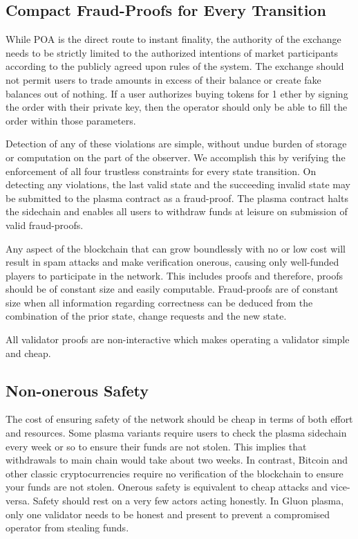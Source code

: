\documentclass[12pt,a4paper]{article}
\begin{document}
\subsection{Compact Fraud-Proofs for Every Transition}
While POA is the direct route to instant finality, the authority of the exchange needs to be strictly limited to the authorized intentions of market participants according to the publicly agreed upon rules of the system. The exchange should not permit users to trade amounts in excess of their balance or create fake balances out of nothing. If a user authorizes buying  tokens for 1 ether by signing the order with their private key, then the operator should only be able to fill the order within those parameters. 

Detection of any of these violations are simple, without undue burden of storage or computation on the part of the observer. We accomplish this by verifying the enforcement of all four trustless constraints for every state transition. On detecting any violations, the last valid state and the succeeding invalid state may be submitted to the plasma contract as a fraud-proof. The plasma contract halts the sidechain and enables all users to withdraw funds at leisure on submission of valid fraud-proofs.

Any aspect of the blockchain that can grow boundlessly with no or low cost will result in spam attacks and make verification onerous, causing only well-funded players to participate in the network. This includes proofs and therefore, proofs should be of constant size and easily computable. Fraud-proofs are of constant size when all information regarding correctness can be deduced from the combination of the prior state, change requests and the new state.

All validator proofs are non-interactive which makes operating a validator simple and cheap. 

\subsection{Non-onerous Safety}
The cost of ensuring safety of the network should be cheap in terms of both effort and resources. Some plasma variants require users to check the plasma sidechain every week or so to ensure their funds are not stolen. This implies that withdrawals to main chain would take about two weeks. In contrast, Bitcoin and other classic cryptocurrencies require no verification of the blockchain to ensure your funds are not stolen. Onerous safety is equivalent to cheap attacks and vice-versa. Safety should rest on a very few actors acting honestly. In Gluon plasma, only one validator needs to be honest and present to prevent a compromised operator from stealing funds. 
\end{document}
